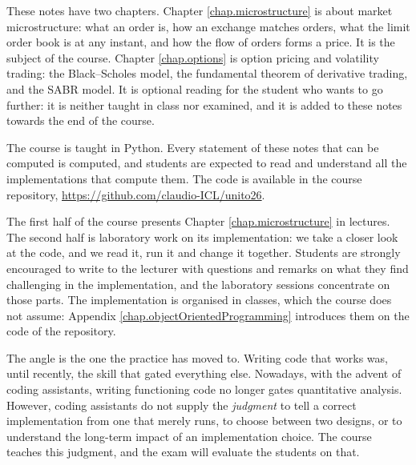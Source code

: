 These notes have two chapters.
Chapter \ref{chap.microstructure} is about market microstructure:
what an order is,
how an exchange matches orders,
what the limit order book is at any instant,
and how the flow of orders forms a price.
It is the subject of the course.
Chapter \ref{chap.options} is option pricing and volatility trading:
the Black--Scholes model,
the fundamental theorem of derivative trading,
and the SABR model.
It is optional reading for the student who wants to go further:
it is neither taught in class nor examined,
and it is added to these notes towards the end of the course.

The course is taught in Python.
Every statement of these notes that can be computed is computed,
and students are expected to read and understand all the implementations that compute them.
The code is available in the course repository,
\url{https://github.com/claudio-ICL/unito26}.

The first half of the course presents Chapter \ref{chap.microstructure} in lectures.
The second half is laboratory work on its implementation:
we take a closer look at the code, and we read it, run it and change it together.
Students are strongly encouraged to write to the lecturer
with questions and remarks on what they find challenging in the implementation,
and the laboratory sessions concentrate on those parts.
The implementation is organised in classes, which the course does not assume:
Appendix \ref{chap.objectOrientedProgramming} introduces them on the code of the repository.

The angle is the one the practice has moved to.
Writing code that works was, until recently, the skill that gated everything else.
Nowadays, with the advent of coding assistants,
writing functioning code no longer gates quantitative analysis.
However,
coding assistants do not supply the \emph{judgment}
to tell a correct implementation from one that merely runs,
to choose between two designs,
or
to understand the long-term impact of an implementation choice.
The course teaches this judgment,
and the exam will evaluate the students on that.
